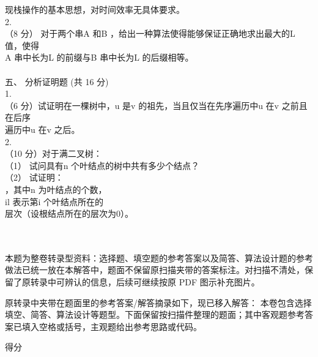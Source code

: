 \begin{question}
现栈操作的基本思想，对时间效率无具体要求。\\
2.\\
（8 分） 对于两个串A 和B ，给出一种算法使得能够保证正确地求出最大的L 值，使得\\
A 串中长为L 的前缀与B 串中长为L 的后缀相等。\\
\\
五、 分析证明题 (共 16 分)\\
1.\\
（6 分）试证明在一棵树中，u 是v 的祖先，当且仅当在先序遍历中u 在v 之前且在后序\\
遍历中u 在v 之后。\\
2.\\
（10 分）对于满二叉树：\\
（1） 试问具有n 个叶结点的树中共有多少个结点？\\
（2） 试证明：\\
，其中n 为叶结点的个数，\\
il 表示第i 个叶结点所在的\\
层次（设根结点所在的层次为0）。\\
\\
\

\begin{solution}
本题为整卷转录型资料：选择题、填空题的参考答案以及简答、算法设计题的参考做法已统一放在本解答中，题面不保留原扫描夹带的答案标注。对扫描不清处，保留了原转录中可辨认的信息，后续可继续按原 PDF 图示补充图片。

\medskip
\noindent 原转录中夹带在题面里的参考答案/解答摘录如下，现已移入解答：
本卷包含选择填空、简答、算法设计等题型。下面保留按扫描件整理的题面；其中客观题参考答案已填入空格或括号，主观题给出参考思路或代码。

得分\\

\end{solution}
\end{question}
